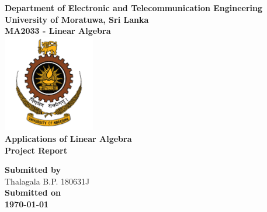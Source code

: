 \begin{titlepage}
\center %

\textbf{\large Department of Electronic and Telecommunication Engineering}\\[0.5cm]
\textbf{\Large University of Moratuwa, Sri Lanka}\\[1cm]
\textbf{\large MA2033 - Linear Algebra}\\[2cm]
\includegraphics[width=0.3\textwidth]{figures/uomlogo}\\[2cm]

	
\textbf{\Huge Applications of Linear Algebra}\\[5mm]
\textbf{\Large Project Report}



\vfill

\textbf{\large Submitted by}\\[0.5cm]

{\large Thalagala B.P.}	\hspace{5mm} {\large 180631J }\\[1cm]


\textbf{\large Submitted on}\\[0.5cm]
\textbf{\Large \today} %



\end{titlepage}